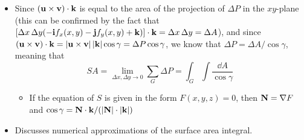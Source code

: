 \documentclass[../main.tex]{subfiles}
\begin{document}
\begin{itemize}
\begin{itemize}
    \end{itemize}
    \item Since $(\vb{u}\times\vb{v})\cdot\vb{k}$ is equal to the area of the projection of $\Delta P$ in the $xy$-plane (this can be confirmed by the fact that $[\Delta x\, \Delta y(-\vb{i}f_x(x,y)-\vb{j}f_y(x,y)+\vb{k})]\cdot\vb{k}=\Delta x\, \Delta y=\Delta A$), and since $(\vb{u}\times\vb{v})\cdot\vb{k}=|\vb{u}\times\vb{v}|\, |\vb{k}|\cos\gamma=\Delta P\cos\gamma$, we know that $\Delta P=\Delta A/\cos\gamma$, meaning that
    \begin{equation*}
        SA = \lim_{\Delta x,\Delta y\to 0}\sum_G\Delta P
        = \int_G\int\frac{\dd{A}}{\cos\gamma}
    \end{equation*}
    \begin{itemize}
        \item If the equation of $S$ is given in the form $F(x,y,z)=0$, then $\vb{N}=\nabla F$ and $\cos\gamma=\vb{N}\cdot\vb{k}/(|\vb{N}|\cdot|\vb{k}|)$
    \end{itemize}
    \item Discusses numerical approximations of the surface area integral.
\end{itemize}
\end{document}
